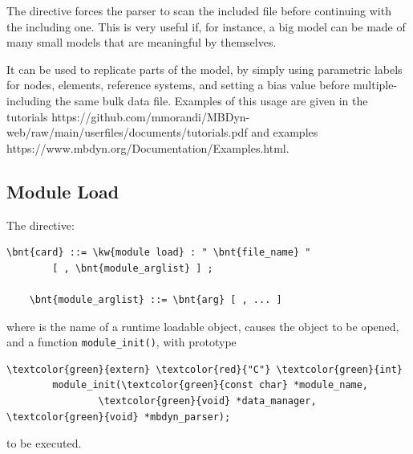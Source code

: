 \bigskip


\bigskip

The  directive forces the parser to scan the included file
 before continuing with the including one.
This is very useful if, for instance, a big model can be made of many
small models that are meaningful by themselves.

It can be used to replicate parts of the model, by simply using parametric 
labels for nodes, elements, reference systems, and setting a bias value 
before multiple-including the same bulk data file.
Examples of this usage are given in the tutorials
	{https://github.com/mmorandi/MBDyn-web/raw/main/userfiles/documents/tutorials.pdf} and examples
	{https://www.mbdyn.org/Documentation/Examples.html}.



\subsection{Module Load}
\label{sec:GENERAL:MODULE-LOAD}
The  directive:
\begin{Verbatim}[commandchars=\\\{\}]
    \bnt{card} ::= \kw{module load} : " \bnt{file_name} "
        [ , \bnt{module_arglist} ] ;

    \bnt{module_arglist} ::= \bnt{arg} [ , ... ]
\end{Verbatim}
where  is the name of a runtime loadable object,
causes the object to be opened, and a function \texttt{module\_init()},
with prototype
\begin{Verbatim}[commandchars=\\\{\}]
        \textcolor{green}{extern} \textcolor{red}{"C"} \textcolor{green}{int}
        module_init(\textcolor{green}{const char} *module_name,
                \textcolor{green}{void} *data_manager, \textcolor{green}{void} *mbdyn_parser);
\end{Verbatim}
to be executed.

